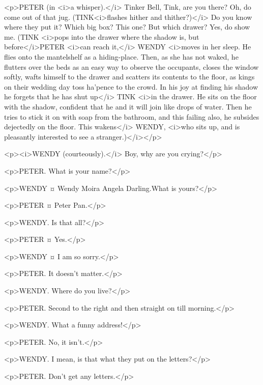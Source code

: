 <p>PETER (in <i>a whisper).</i> Tinker Bell, Tink, are you there?
Oh, do come out of that jug. (TINK<i>flashes hither and thither?)</i> Do you know where they put it?
Which big box? This one? But which drawer? Yes, do show me. (TINK <i>pops into the drawer where the shadow is, but before</i>PETER <i>can reach it,</i> WENDY <i>moves in her sleep. He flies onto the mantelshelf as a hiding-place. Then, as she has not waked, he flutters over the beds as an easy way to observe the occupants, closes the window softly, wafts himself to the drawer and scatters its contents to the floor, as kings on their wedding day toss ha'pence to the crowd. In his joy at finding his shadow he forgets that he has shut up</i> TINK <i>in the drawer. He sits on the floor with the shadow, confident that he and it will join like drops of water. Then he tries to stick it on with soap from the bathroom, and this failing also, he subsides dejectedly on the floor. This wakens</i> WENDY, <i>who sits up, and is pleasantly interested to see a stranger.)</i></p>

<p><i>WENDY (courteously).</i> Boy, why are you crying?</p>


<p>PETER. What is your name?</p>

<p>WENDY ¤
Wendy Moira Angela Darling.What is yours?</p>

<p>PETER ¤
Peter Pan.</p>

<p>WENDY. Is that all?</p>

<p>PETER ¤
Yes.</p>

<p>WENDY ¤
I am so sorry.</p>

<p>PETER. It doesn't matter.</p>

<p>WENDY. Where do you live?</p>

<p>PETER. Second to the right and then straight on till morning.</p>

<p>WENDY. What a funny address!</p>

<p>PETER. No, it isn't.</p>

<p>WENDY. I mean, is that what they put on the letters?</p>

<p>PETER. Don't get any letters.</p>


